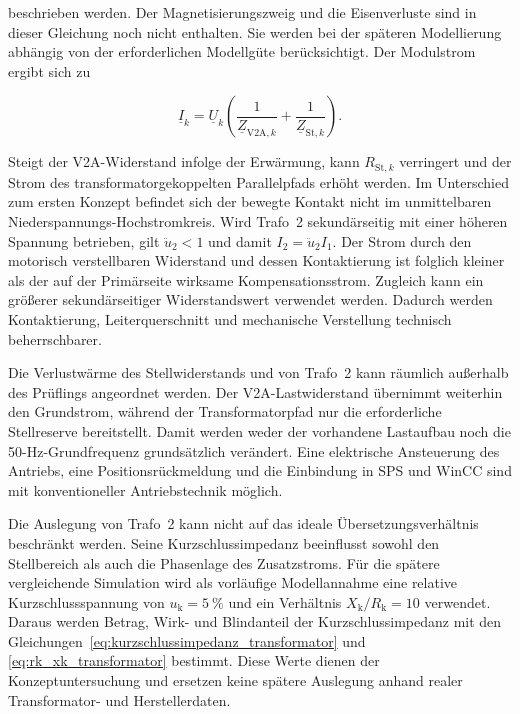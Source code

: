 beschrieben werden. Der Magnetisierungszweig und die Eisenverluste sind in
dieser Gleichung noch nicht enthalten. Sie werden bei der späteren
Modellierung abhängig von der erforderlichen Modellgüte berücksichtigt. Der
Modulstrom ergibt sich zu

\begin{equation}
    \underline I_k
    =
    \underline U_k
    \left(
        \frac{1}{\underline Z_{\mathrm{V2A},k}}
        +
        \frac{1}{\underline Z_{\mathrm{St},k}}
    \right).
    \label{eq:konzept_trafo2_modulstrom}
\end{equation}

Steigt der V2A-Widerstand infolge der Erwärmung, kann
$R_{\mathrm{St},k}$ verringert und der Strom des transformatorgekoppelten
Parallelpfads erhöht werden. Im Unterschied zum ersten Konzept befindet sich
der bewegte Kontakt nicht im unmittelbaren Niederspannungs-Hochstrom\-kreis.
Wird Trafo~2 sekundärseitig mit einer höheren Spannung betrieben, gilt
$\ddot{u}_{2}<1$ und damit $I_2=\ddot{u}_{2}I_1$. Der Strom durch den
motorisch verstellbaren Widerstand und dessen Kontaktierung ist folglich
kleiner als der auf der Primärseite wirksame Kompensationsstrom. Zugleich
kann ein größerer sekundärseitiger Widerstandswert verwendet werden. Dadurch
werden Kontaktierung, Leiterquerschnitt und mechanische Verstellung technisch
beherrschbarer.

Die Verlustwärme des Stellwiderstands und von Trafo~2 kann räumlich außerhalb
des Prüflings angeordnet werden. Der V2A-Lastwiderstand übernimmt weiterhin
den Grundstrom, während der Transformatorpfad nur die erforderliche
Stellreserve bereitstellt. Damit werden weder der vorhandene Lastaufbau noch
die 50-Hz-Grundfrequenz grundsätzlich verändert. Eine elektrische
Ansteuerung des Antriebs, eine Positionsrückmeldung und die Einbindung in SPS
und WinCC sind mit konventioneller Antriebstechnik möglich.

Die Auslegung von Trafo~2 kann nicht auf das ideale Übersetzungsverhältnis
beschränkt werden. Seine Kurzschlussimpedanz beeinflusst sowohl den
Stellbereich als auch die Phasenlage des Zusatzstroms. Für die spätere
vergleichende Simulation wird als vorläufige Modellannahme eine relative
Kurzschlussspannung von $u_{\mathrm{k}}=\SI{5}{\percent}$ und ein Verhältnis
$X_{\mathrm{k}}/R_{\mathrm{k}}=10$ verwendet. Daraus werden Betrag, Wirk- und
Blindanteil der Kurzschlussimpedanz mit den
Gleichungen~\ref{eq:kurzschlussimpedanz_transformator} und
\ref{eq:rk_xk_transformator} bestimmt. Diese Werte dienen der
Konzeptuntersuchung und ersetzen keine spätere Auslegung anhand realer
Transformator- und Herstellerdaten.

